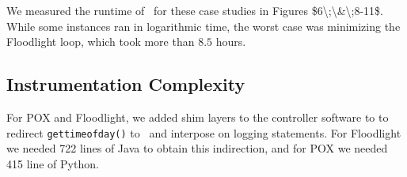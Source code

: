We measured the runtime of \projectname~for these case studies in Figures
\num{$6\;\&\;8-11$}.
While some instances ran in logarithmic time, the worst case was minimizing
the Floodlight loop,
which took more than $8.5$ hours.

%



%

\subsection{Instrumentation Complexity}

For POX and Floodlight, we added shim layers to the controller software to
to redirect {\tt gettimeofday()} to \projectname~and interpose on logging
statements. For Floodlight we needed 722 lines of Java to obtain this
indirection, and for POX we needed 415 line of Python.


